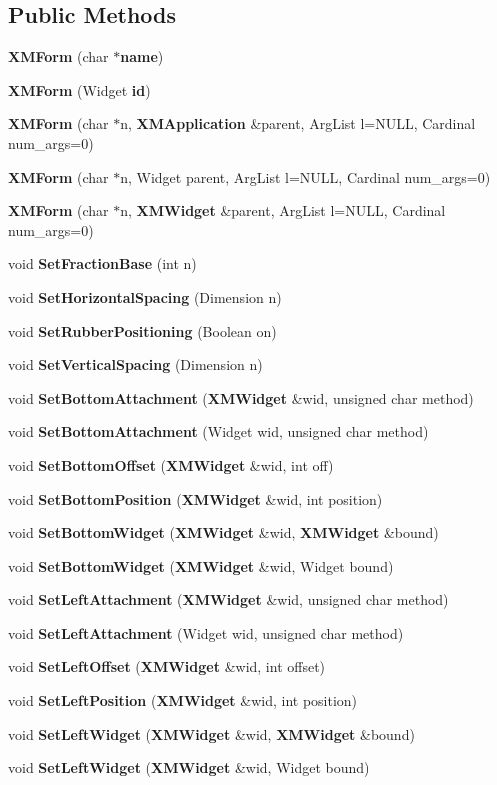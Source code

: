 \subsection*{Public Methods}
\begin{CompactItemize}
\item 
{\bf XMForm} (char $\ast${\bf name})
\item 
{\bf XMForm} (Widget {\bf id})
\item 
{\bf XMForm} (char $\ast$n, {\bf XMApplication} \&parent, Arg\-List l=NULL, Cardinal num\_\-args=0)
\item 
{\bf XMForm} (char $\ast$n, Widget parent, Arg\-List l=NULL, Cardinal num\_\-args=0)
\item 
{\bf XMForm} (char $\ast$n, {\bf XMWidget} \&parent, Arg\-List l=NULL, Cardinal num\_\-args=0)
\item 
void {\bf Set\-Fraction\-Base} (int n)
\item 
void {\bf Set\-Horizontal\-Spacing} (Dimension n)
\item 
void {\bf Set\-Rubber\-Positioning} (Boolean on)
\item 
void {\bf Set\-Vertical\-Spacing} (Dimension n)
\item 
void {\bf Set\-Bottom\-Attachment} ({\bf XMWidget} \&wid, unsigned char method)
\item 
void {\bf Set\-Bottom\-Attachment} (Widget wid, unsigned char method)
\item 
void {\bf Set\-Bottom\-Offset} ({\bf XMWidget} \&wid, int off)
\item 
void {\bf Set\-Bottom\-Position} ({\bf XMWidget} \&wid, int position)
\item 
void {\bf Set\-Bottom\-Widget} ({\bf XMWidget} \&wid, {\bf XMWidget} \&bound)
\item 
void {\bf Set\-Bottom\-Widget} ({\bf XMWidget} \&wid, Widget bound)
\item 
void {\bf Set\-Left\-Attachment} ({\bf XMWidget} \&wid, unsigned char method)
\item 
void {\bf Set\-Left\-Attachment} (Widget wid, unsigned char method)
\item 
void {\bf Set\-Left\-Offset} ({\bf XMWidget} \&wid, int offset)
\item 
void {\bf Set\-Left\-Position} ({\bf XMWidget} \&wid, int position)
\item 
void {\bf Set\-Left\-Widget} ({\bf XMWidget} \&wid, {\bf XMWidget} \&bound)
\item 
void {\bf Set\-Left\-Widget} ({\bf XMWidget} \&wid, Widget bound)

\end{CompactItemize}
